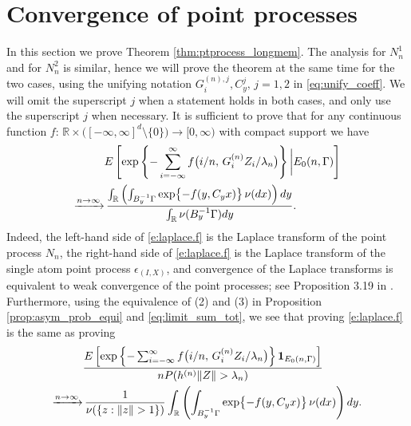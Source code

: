 \documentclass[11pt,reqno]{amsart}
\numberwithin{equation}{section}
\theoremstyle{definition}
\theoremstyle{remark}
\theoremstyle{definition}
\newcommand{\RR}{\mathbb{R}}
\newcommand{\bbr}{\RR}
\newcommand{\one}{{\bf 1}}
\begin{document}
\section{Convergence of point processes}\label{sec:pt_process}

In this section we prove Theorem \ref{thm:ptprocess_longmem}. The
analysis for $N_n^1$ and for $N_n^2$ is similar, hence we will prove
the theorem at the same time for the two cases, using the 
unifying notation $G_i^{(n),j}, C_y^j, \, j=1,2$ in
\eqref{eq:unify_coeff}. We will omit
the superscript $j$ when a statement holds in both cases, and only
use the superscript $j$ when necessary. 
It is 
sufficient to prove that for any continuous function $f:\,
\bbr\times \bigl([-\infty,\infty]^d\setminus \{0\})\to [0,\infty)$ with
compact support we have
\begin{align} \label{e:laplace.f}
&E\left[\exp\left\{ -\sum_{i=-\infty}^\infty  f\big(i/n, \, G_i^{(n)}
Z_i/\lambda_n\big)\right\} \bigg| E_0(n,\Gamma)\right] \\
  \notag \xrightarrow{n\to\infty}&  
\, \frac{\int_\bbr \left( \int_{B_y^{-1}\Gamma} \exp\bigl\{ -f(y,C_yx)\bigr\}\,
              \nu(dx)\right)dy}{\int_\bbr \nu( B_y^{-1}\Gamma) dy}.              
\end{align}
Indeed, the left-hand side of \eqref{e:laplace.f} is the Laplace
transform of  the point process $N_n$,  the right-hand side of
\eqref{e:laplace.f} is the Laplace transform of the single atom point
process $\epsilon_{(I,X)}$, and convergence of the Laplace transforms
is equivalent to weak convergence of the point processes; see
Proposition 3.19 in \cite{resnick:1987}. Furthermore, using the
equivalence of (2) and (3) in Proposition \ref{prop:asym_prob_equi}
and \eqref{eq:limit_sum_tot}, we see that proving \eqref{e:laplace.f}
is the same as proving 
\begin{align} \label{e:laplace.falt}
&\frac{E\left[\exp\left\{ -\sum_{i=-\infty}^\infty  f\big(i/n, \, G_i^{(n)}
    Z_i/\lambda_n\big)\right\} \one_{E_0(n,\Gamma)}\right]}
{n P(h^{(n)}\|Z\|>\lambda_n)}\\
  \notag \xrightarrow{n\to\infty}& 
\, \frac{1}{\nu(\{z: \|z\|> 1\})}
\int_\bbr \left( \int_{B_y^{-1}\Gamma} \exp\bigl\{ -f(y,C_yx)\bigr\}\,
              \nu(dx)\right)dy.
\end{align}
\end{document}
